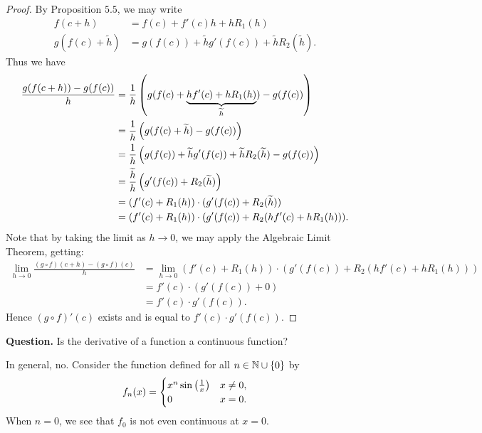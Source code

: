 \documentclass[class=article, crop=false]{standalone}
\begin{document}
  \begin{proof}
    By Proposition $5.5$, we may write
    \begin{align*}
      f(c + h) &= f(c) + f'(c)h + hR_1(h) \\
      g(f(c) + \widetilde h) &= g(f(c)) + \widetilde h g'(f(c)) + \widetilde h R_2(\widetilde h).
    \end{align*}
    Thus we have
    \begin{align*}
      \frac{g(f(c + h)) - g(f(c))}{h} &= \frac{1}{h}\left( g(f(c) + \underbrace{hf'(c) + hR_1(h)}_{\widetilde h}) - g(f(c)) \right) \\
                                      &= \frac{1}{h}\left( g(f(c) + \widetilde h) - g(f(c)) \right) \\
                                      &= \frac{1}{h} \left( g(f(c)) + \widetilde h g'(f(c)) + \widetilde h R_2(\widetilde h) - g(f(c)) \right) \\
                                      &= \frac{\widetilde h}{h} \left( g'(f(c)) + R_2(\widetilde h) \right) \\
                                      &= (f'(c) + R_1(h))\cdot (g'(f(c)) + R_2(\widetilde h)) \\
                                      &= (f'(c) + R_1(h))\cdot (g'(f(c)) + R_2(hf'(c) + hR_1(h))).
    \end{align*}
    Note that by taking the limit as $h\to 0$, we may apply the Algebraic Limit Theorem, getting:
    \begin{align*}
      \lim_{h\to 0} \frac{(g\circ f)(c + h) - (g\circ f)(c)}{h} &= \lim_{h\to 0} (f'(c) + R_1(h))\cdot (g'(f(c)) + R_2(hf'(c) + hR_1(h))) \\
                                                                &= f'(c)\cdot (g'(f(c)) + 0) \\
                                                                &= f'(c)\cdot g'(f(c)).
    \end{align*}
    Hence $(g\circ f)'(c)$ exists and is equal to $f'(c)\cdot g'(f(c))$.
  \end{proof}
  \textbf{Question.} Is the derivative of a function a continuous function? \par
  In general, no. Consider the function defined for all $n\in\mathbb{N}\cup \left\{0\right\}$ by
  \[
    f_n(x) = \begin{cases}x^n\sin \left( \frac{1}{x} \right) & x\neq 0, \\ 0 & x = 0.\end{cases}
  \]
  When $n = 0$, we see that $f_0$ is not even continuous at $x = 0$. \par
\end{document}
